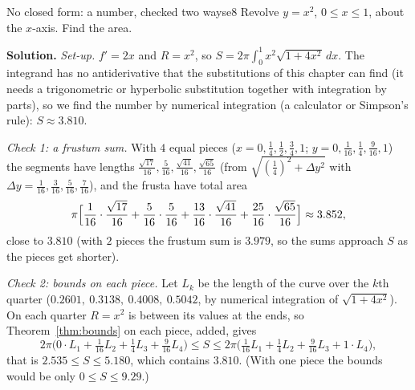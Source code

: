 \documentclass[11pt]{article}
\begin{document}
\begin{exmp}{No closed form: a number, checked two ways}{e8}
Revolve $y=x^2$, $0\le x\le1$, about the $x$-axis. Find the area.

\textbf{Solution.} \emph{Set-up.} $f'=2x$ and $R=x^2$, so $S=2\pi\int_0^1x^2\sqrt{1+4x^2}\,dx$. The integrand has no antiderivative that the substitutions of this chapter can find (it needs a trigonometric or hyperbolic substitution together with integration by parts), so we find the number by numerical integration (a calculator or Simpson's rule): $S\approx3.810$.

\emph{Check 1: a frustum sum.} With $4$ equal pieces ($x=0,\frac14,\frac12,\frac34,1$; $y=0,\frac1{16},\frac14,\frac9{16},1$) the segments have lengths $\frac{\sqrt{17}}{16},\frac5{16},\frac{\sqrt{41}}{16},\frac{\sqrt{65}}{16}$ (from $\sqrt{(\frac14)^2+\Delta y^2}$ with $\Delta y=\frac1{16},\frac3{16},\frac5{16},\frac7{16}$), and the frusta have total area
\[
\pi\Bigl[\frac1{16}\cdot\frac{\sqrt{17}}{16}+\frac5{16}\cdot\frac5{16}+\frac{13}{16}\cdot\frac{\sqrt{41}}{16}+\frac{25}{16}\cdot\frac{\sqrt{65}}{16}\Bigr]\approx3.852 ,
\]
close to $3.810$ (with $2$ pieces the frustum sum is $3.979$, so the sums approach $S$ as the pieces get shorter).

\emph{Check 2: bounds on each piece.} Let $L_k$ be the length of the curve over the $k$th quarter ($0.2601,\ 0.3138,\ 0.4008,\ 0.5042$, by numerical integration of $\sqrt{1+4x^2}$). On each quarter $R=x^2$ is between its values at the ends, so Theorem~\ref{thm:bounds} on each piece, added, gives
\[
2\pi\bigl(0\cdot L_1+\tfrac1{16}L_2+\tfrac14L_3+\tfrac9{16}L_4\bigr)\le S\le2\pi\bigl(\tfrac1{16}L_1+\tfrac14L_2+\tfrac9{16}L_3+1\cdot L_4\bigr),
\]
that is $2.535\le S\le5.180$, which contains $3.810$. (With one piece the bounds would be only $0\le S\le9.29$.)


\end{exmp}
\end{document}
